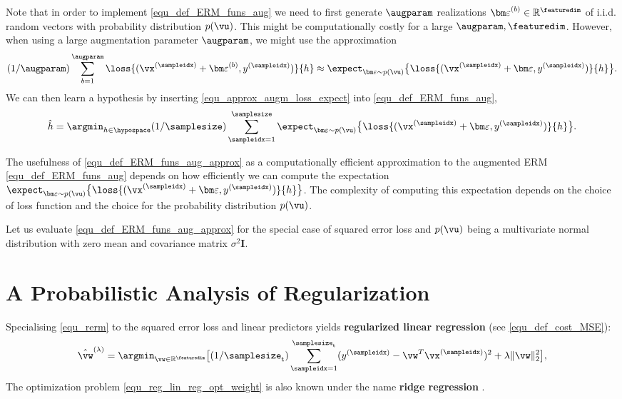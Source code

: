 \documentclass[12pt]{report}
\newcommand{\featurelen}{\featuredim}
\begin{document}
Note that in order to implement \eqref{equ_def_ERM_funs_aug} we need to first generate 
$\augparam$ realizations  ${\bm \varepsilon}^{(b)} \in \mathbb{R}^{\featurelen}$ of i.i.d.
random vectors with probability distribution $p(\vu)$. 
This might be computationally costly for a large $\augparam, \featurelen$. 
However, when using a large augmentation parameter $\augparam$, we might 
use the approximation  
\begin{align}
\label{equ_approx_augm_loss_expect}
 (1/\augparam)\sum_{b=1}^{\augparam} \loss{(\vx^{(\sampleidx)}+{\bm \varepsilon}^{(b)},y^{(\sampleidx)})}{h} \approx  
 \expect_{{\bm \varepsilon} \sim p(\vu) } \big\{ \loss{(\vx^{(\sampleidx)}+{\bm \varepsilon},y^{(\sampleidx)})}{h} \big\}. 
\end{align}
We can then learn a hypothesis by inserting \eqref{equ_approx_augm_loss_expect} into \eqref{equ_def_ERM_funs_aug}, 
\begin{align}
\label{equ_def_ERM_funs_aug_approx}
\hat{h}  = \argmin_{h \in \hypospace} (1/\samplesize) \sum_{\sampleidx=1}^{\samplesize} \expect_{{\bm \varepsilon} \sim p(\vu) } \big\{ \loss{(\vx^{(\sampleidx)}+{\bm \varepsilon},y^{(\sampleidx)})}{h} \big\}. 
\end{align}


The usefulness of \eqref{equ_def_ERM_funs_aug_approx} as a computationally efficient approximation to 
the augmented ERM \eqref{equ_def_ERM_funs_aug} depends on how efficiently we can compute the 
expectation $\expect_{{\bm \varepsilon} \sim p(\vu) } \big\{ \loss{(\vx^{(\sampleidx)}+{\bm \varepsilon},y^{(\sampleidx)})}{h} \big\}$. 
The complexity of computing this expectation depends on the choice of loss function and the 
choice for the probability distribution $p(\vu)$.  

Let us evaluate \eqref{equ_def_ERM_funs_aug_approx} for the special case of squared error loss and $p(\vu)$ 
being a multivariate normal distribution with zero mean and covariance matrix $\sigma^{2} \mathbf{I}$. 

 







\section{A Probabilistic Analysis of Regularization}
\label{sec_prob_mod_regularization}

Specialising \eqref{equ_rerm} to the squared error loss and linear predictors 
yields {\bf regularized linear regression} (see \eqref{equ_def_cost_MSE}): 
\begin{equation} 
\label{equ_reg_lin_reg_opt_weight}
\hat{\vw}^{(\lambda)} = \argmin_{\vw \in \mathbb{R}^{\featuredim}} \big[ (1/\samplesize_{\rm t}) \sum_{\sampleidx=1}^{\samplesize_{\rm t}}  (y^{(\sampleidx)} - \vw^{T}\vx^{(\sampleidx)}  )^2 + \lambda \| \vw \|^{2}_{2}\big], 
\end{equation} 
The optimization problem \eqref{equ_reg_lin_reg_opt_weight} is also known 
under the name {\bf ridge regression} \cite{hastie01statisticallearning}. 
\end{document}
